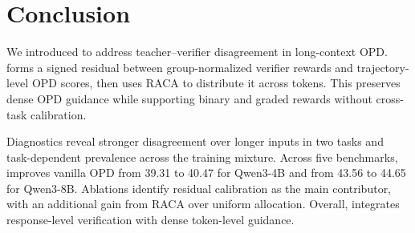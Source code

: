 \section{Conclusion}

We introduced \method{} to address teacher--verifier disagreement in long-context OPD. \method{} forms a signed residual between group-normalized verifier rewards and trajectory-level OPD scores, then uses RACA to distribute it across tokens. This preserves dense OPD guidance while supporting binary and graded rewards without cross-task calibration.

Diagnostics reveal stronger disagreement over longer inputs in two tasks and task-dependent prevalence across the training mixture. Across five benchmarks, \method{} improves vanilla OPD from 39.31 to 40.47 for Qwen3-4B and from 43.56 to 44.65 for Qwen3-8B. Ablations identify residual calibration as the main contributor, with an additional gain from RACA over uniform allocation. Overall, \method{} integrates response-level verification with dense token-level guidance.
